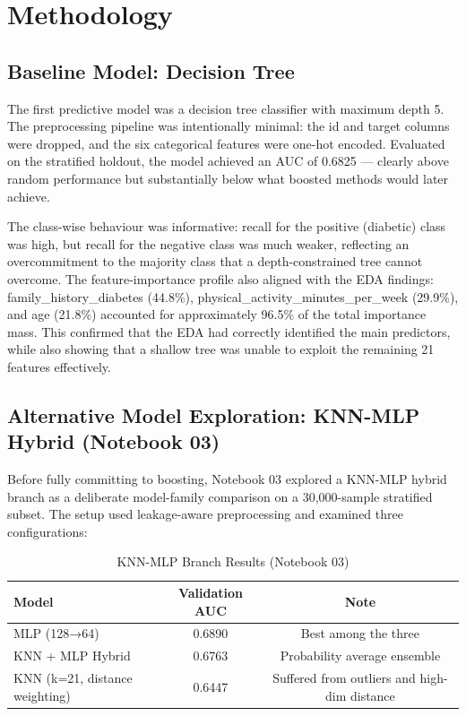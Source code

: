 \documentclass[a4paper,11pt]{article}
\begin{document}
\section{Methodology}

\subsection{Baseline Model: Decision Tree}

The first predictive model was a decision tree classifier with maximum depth 5. The preprocessing pipeline was intentionally minimal: the id and target columns were dropped, and the six categorical features were one-hot encoded. Evaluated on the stratified holdout, the model achieved an AUC of 0.6825 --- clearly above random performance but substantially below what boosted methods would later achieve.

The class-wise behaviour was informative: recall for the positive (diabetic) class was high, but recall for the negative class was much weaker, reflecting an overcommitment to the majority class that a depth-constrained tree cannot overcome. The feature-importance profile also aligned with the EDA findings: family\_history\_diabetes (44.8\%), physical\_activity\_minutes\_per\_week (29.9\%), and age (21.8\%) accounted for approximately 96.5\% of the total importance mass. This confirmed that the EDA had correctly identified the main predictors, while also showing that a shallow tree was unable to exploit the remaining 21 features effectively.

\subsection{Alternative Model Exploration: KNN-MLP Hybrid (Notebook 03)}

Before fully committing to boosting, Notebook 03 explored a KNN-MLP hybrid branch as a deliberate model-family comparison on a 30,000-sample stratified subset. The setup used leakage-aware preprocessing and examined three configurations:

\begin{table}[H]
\centering
\caption{KNN-MLP Branch Results (Notebook 03)}
\label{tab:knn_mlp_results}
\begin{tabular}{lcc}
\toprule
\textbf{Model} & \textbf{Validation AUC} & \textbf{Note} \\
\midrule
MLP (128→64) & 0.6890 & Best among the three \\
KNN + MLP Hybrid & 0.6763 & Probability average ensemble \\
KNN (k=21, distance weighting) & 0.6447 & Suffered from outliers and high-dim distance \\
\bottomrule
\end{tabular}
\end{table}
\end{document}
